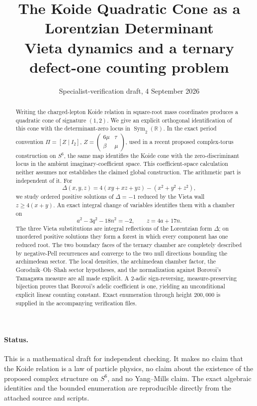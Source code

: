 \documentclass[11pt]{article}
\title{The Koide Quadratic Cone as a Lorentzian Determinant\\
\large Vieta dynamics and a ternary defect-one counting problem}
\author{}
\date{Specialist-verification draft, 4 September 2026}
\numberwithin{equation}{section}
\theoremstyle{definition}
\theoremstyle{remark}
\newcommand{\R}{\mathbb R}
\begin{document}
\maketitle

\begin{abstract}
Writing the charged-lepton Koide relation in square-root mass coordinates produces a quadratic cone of signature $(1,2)$.  We give an explicit orthogonal identification of this cone with the determinant-zero locus in $\operatorname{Sym}_2(\R)$.  In the exact period convention $\Pi=[Z\mid I_2]$, $Z=\left(\begin{smallmatrix}6\mu&\tau\\ \beta&\mu\end{smallmatrix}\right)$, used in a recent proposed complex-torus construction on $S^6$, the same map identifies the Koide cone with the zero-discriminant locus in the ambient imaginary-coefficient space.  This coefficient-space calculation neither assumes nor establishes the claimed global construction.  The arithmetic part is independent of it.  For
\[
 \Delta(x,y,z)=4(xy+xz+yz)-(x^2+y^2+z^2),
\]
we study ordered positive solutions of $\Delta=-1$ reduced by the Vieta wall $z\geq4(x+y)$.  An exact integral change of variables identifies them with a chamber on
\[
 a^2-3q^2-18n^2=-2,
 \qquad z=4a+17n.
\]
The three Vieta substitutions are integral reflections of the Lorentzian
form $\Delta$; on unordered positive solutions they form a forest in which
every component has one reduced root.  The two boundary faces of the ternary
chamber are completely described by negative-Pell recurrences and converge
to the two null directions bounding the archimedean sector.
The local densities, the archimedean chamber factor, the Gorodnik--Oh--Shah
sector hypotheses, and the normalization against Borovoi's Tamagawa measure
are all made explicit.  A $2$-adic sign-reversing, measure-preserving
bijection proves that Borovoi's adelic coefficient is one, yielding an
unconditional explicit linear counting constant.  Exact enumeration through
height $200{,}000$ is supplied in the accompanying verification files.
\end{abstract}

\paragraph{Status.}
This is a mathematical draft for independent checking.  It makes no claim that the Koide relation is a law of particle physics, no claim about the existence of the proposed complex structure on $S^6$, and no Yang--Mills claim.  The exact algebraic identities and the bounded enumeration are reproducible directly from the attached source and scripts.
\end{document}
